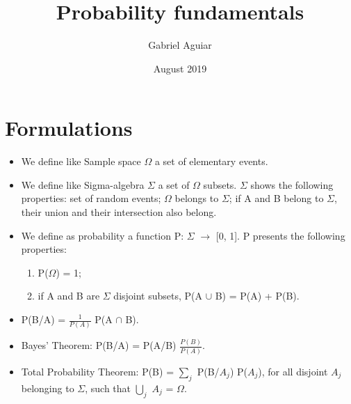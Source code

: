 \documentclass{article}
\title{Probability fundamentals}
\author{Gabriel Aguiar}
\date{August 2019}
\begin{document}
\maketitle

\section{Formulations}

\begin{itemize}
    
\item We define like Sample space $\Omega$ a set of elementary events.
        
\item We define like Sigma-algebra $\Sigma$ a set of $\Omega$ subsets. $\Sigma$ shows the following properties: set of random events; $\Omega$ belongs to $\Sigma$; if A and B belong to $\Sigma$, their union and their intersection also belong.

\item We define as probability a function P: $\Sigma$ $\rightarrow$ [0, 1]. P presents the following properties: 
\begin{enumerate}
\item P($\Omega$) = 1; 
\item if A and B are $\Sigma$ disjoint subsets, P(A $\cup$ B) = P(A) + P(B).
\end{enumerate}

\item P(B/A) = $\frac{1}{P(A)}$ P(A $\cap$ B).

\item Bayes' Theorem: P(B/A) = P(A/B) $\frac{P(B)}{P(A)}$.

\item Total Probability Theorem: P(B) = $\sum\limits_{j}$ P(B/$A_{j}$) P($A_{j}$), for all disjoint $A_{j}$ belonging to $\Sigma$, such that $\bigcup\limits_{j}$ $A_{j}$ = $\Omega$.



        
\end{itemize}
\end{document}
